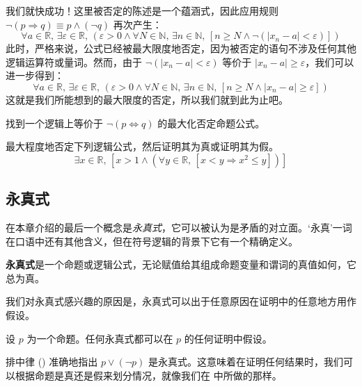 \begin{example}
%
我们就快成功！这里被否定的陈述是一个蕴涵式，因此应用规则 $\neg (p \Rightarrow q) \equiv p \wedge (\neg q)$ 再次产生：
\[ \forall a \in \mathbb{R},\, \exists \varepsilon \in \mathbb{R},\, (\varepsilon > 0 \wedge \forall N \in \mathbb{N},\, \exists n \in \mathbb{N},\, [n \ge N \wedge \neg (|x_n - a| < \varepsilon)])\]
%
此时，严格来说，公式已经被最大限度地否定，因为被否定的语句不涉及任何其他逻辑运算符或量词。然而，由于 $\neg (|x_n-a| < \varepsilon)$ 等价于 $|x_n - a| \ge \varepsilon$，我们可以进一步得到：
\[ \forall a \in \mathbb{R},\, \exists \varepsilon \in \mathbb{R},\, (\varepsilon > 0 \wedge \forall N \in \mathbb{N},\, \exists n \in \mathbb{N},\, [n \ge N \wedge |x_n - a| \ge \varepsilon])\]
%
这就是我们所能想到的最大限度的否定，所以我们就到此为止吧。
\end{example}

\begin{exercise}
找到一个逻辑上等价于 $\neg (p \Leftrightarrow q)$ 的最大化否定命题公式。
\end{exercise}

\begin{exercise}
最大程度地否定下列逻辑公式，然后证明其为真或证明其为假。
\[ \exists x \in \mathbb{R},\, [x > 1 \wedge (\forall y \in \mathbb{R},\, [x < y \Rightarrow x^2 \le y])]\]
\end{exercise}

\subsection*{永真式}

在本章介绍的最后一个概念是\textit{永真式}，它可以被认为是矛盾的对立面。`永真'一词在口语中还有其他含义，但在符号逻辑的背景下它有一个精确定义。

\begin{definition}
\label{defTautology}
\textbf{永真式}是一个命题或逻辑公式，无论赋值给其组成命题变量和谓词的真值如何，它总为真。
\end{definition}

我们对永真式感兴趣的原因是，永真式可以出于任意原因在证明中的任意地方用作假设。

\begin{strategy}[永真假设]
设 $p$ 为一个命题。任何永真式都可以在 $p$ 的任何证明中假设。
\end{strategy}

\begin{example}
排中律 () 准确地指出 $p \vee (\neg p)$ 是永真式。这意味着在证明任何结果时，我们可以根据命题是真还是假来划分情况，就像我们在  中所做的那样。
\end{example}

